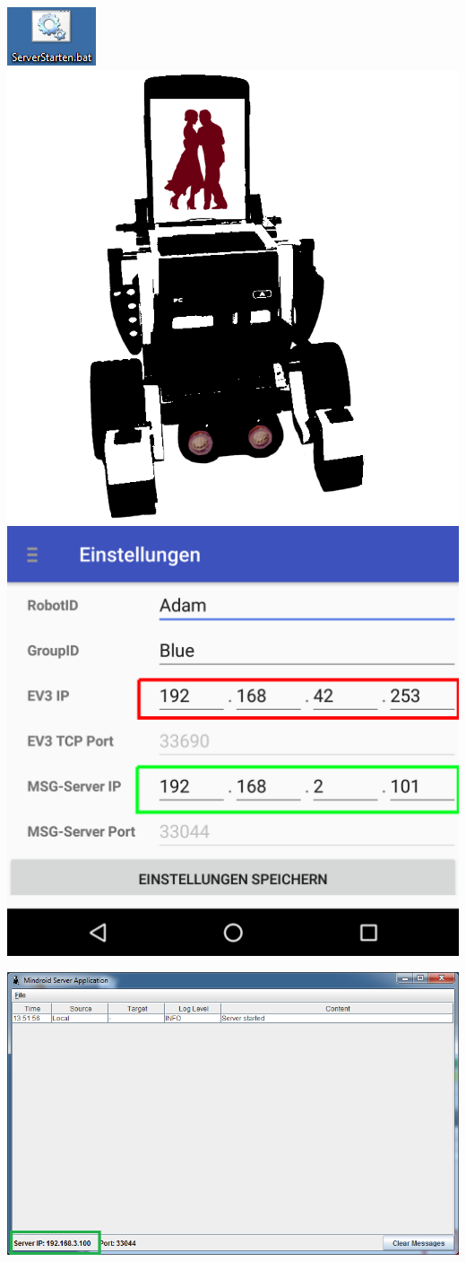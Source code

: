 \documentclass[
	12pt,
	article,
	type=bsc, %
	colorbacktitle,
	instlogo,
	accentcolor=tud1c,
	german,
	twoside
]{tudexercise}
\begin{document}
\begin{enumerate}
\begin{minipage}{.5\textwidth}
	\centering
	\includegraphics[width=.4\textwidth]{img/pc_serverbat.png}
	\includegraphics[width=.2\textwidth]{img/app_logo.png}
	\includegraphics[width=.8\textwidth]{img/app_settings_short.png}
	
	\end{minipage}
	\begin{center}
	\includegraphics[width=.9\textwidth]{img/pc_server.png}
	\end{center}	

	
	
	\end{enumerate}
	
\end{document}
